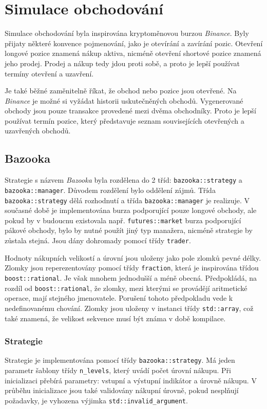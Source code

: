 \chapter{Simulace obchodování}
Simulace obchodování byla inspirována kryptoměnovou burzou \textit{Binance}.
Byly přijaty některé konvence pojmenování, jako je otevírání a zavírání pozic.
Otevření longové pozice znamená nákup aktiva, nicméně otevření shortové pozice znamená jeho prodej.
Prodej a nákup tedy jdou proti sobě, a proto je lepší používat termíny otevření a uzavření.

Je také běžné zaměnitelně říkat, že obchod nebo pozice jsou otevřené.
Na \textit{Binance} je možné si vyžádat historii uskutečněných obchodů.
Vygenerované obchody jsou pouze transakce provedené mezi dvěma obchodníky.
Proto je lepší používat termín pozice, který představuje seznam souvisejících otevřených a uzavřených obchodů.

\section{Bazooka}
Strategie s názvem \textit{Bazooka} byla rozdělena do 2 tříd: \texttt{bazooka::strategy} a \texttt{bazooka::manager}.
Důvodem rozdělení bylo oddělení zájmů.
Třída \texttt{bazooka::strategy} dělá rozhodnutí a třída \texttt{bazooka::manager} je realizuje.
V současné době je implementována burza podporující pouze longové obchody, ale pokud by v budoucnu existovala např. \texttt{futures::market} burza podporující pákové obchody, bylo by nutné použít jiný typ manažera, nicméně strategie by zůstala stejná.
Jsou dány dohromady pomocí třídy \texttt{trader}.

Hodnoty nákupních velikostí a úrovní jsou uloženy jako pole zlomků pevné délky.
Zlomky jsou reperezentovány pomocí třídy \texttt{fraction}, která je inspirována třídou \texttt{boost::rational}.
Je však mnohem jednodušší a méně obecná.
Předpokládá, na rozdíl od \texttt{boost::rational}, že zlomky, mezi kterými se provádějí aritmetické operace, mají stejného jmenovatele.
Porušení tohoto předpokladu vede k nedefinovanému chování.
Zlomky jsou uloženy v instanci třídy \texttt{std::array}, což také znamená, že velikost sekvence musí být známa v době kompilace.

\subsection{Strategie}
Strategie je implementována pomocí třídy \texttt{bazooka::strategy}.
Má jeden parametr šablony třídy \texttt{n\_levels}, který uvádí počet úrovní nákupu.
Při inicializaci přebírá parametry: vstupní a výstupní indikátor a úrovně nákupu.
V průběhu inicializace jsou také validovány nákupní úrovně, pokud nesplňují požadavky, je vyhozena výjimka \texttt{std::invalid\_argument}.


